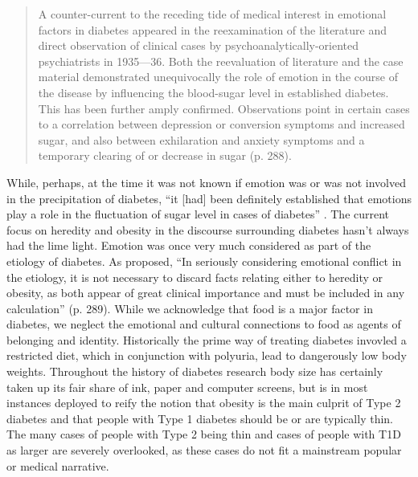 \documentclass[12pt]{article}
\begin{document}
\begin{singlespace}
  \begin{quote} 
A counter-current to the receding tide of medical interest in emotional factors in diabetes appeared in the reexamination of the literature and direct observation of 
clinical cases by psychoanalytically-oriented psychiatrists in 1935—36. Both the reevaluation of literature and the case material demonstrated unequivocally the role of 
emotion in the course of the disease by influencing the blood-sugar level in established diabetes. This has been further amply confirmed. Observations point in certain cases 
to a correlation between depression or conversion symptoms and increased sugar, and also between exhilaration and anxiety symptoms and a temporary clearing of or decrease
in sugar (p. 288).\end{quote} 
    \end{singlespace}
While, perhaps, at the time it was not known if emotion was or was not involved in the precipitation of diabetes, ``it [had] been definitely established that emotions play a role in the fluctuation of sugar level in cases of diabetes'' \citep[p. 290]{daniels_role_1948}.
The current focus on heredity and obesity in the discourse surrounding diabetes hasn't always had the lime light. Emotion was once very much considered as part of the etiology of diabetes. As \citet{daniels_role_1948} proposed,
``In seriously considering emotional conflict in the etiology, it is not necessary to discard facts relating either to heredity or obesity, as both appear of great clinical importance and must be included in any calculation'' (p. 289). While we acknowledge that food is a major factor in diabetes, we neglect the emotional and cultural connections to food as agents of belonging and identity. Historically the prime way of treating diabetes invovled a restricted diet, which in conjunction with polyuria, lead to dangerously low body weights. Throughout the history of diabetes research body size has certainly taken up its fair share of ink, paper and computer screens, but is in most instances deployed to reify the notion that obesity is the main culprit of Type 2 diabetes and that people with Type 1 diabetes should be or are typically thin. The many cases of people with Type 2 being thin and cases of people with T1D as larger are severely overlooked, as these cases do not fit a mainstream popular or medical narrative. 
\end{document}
